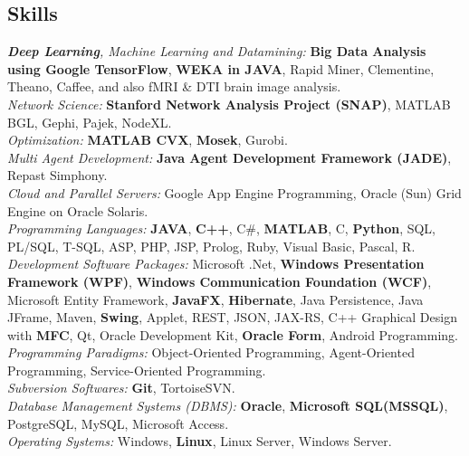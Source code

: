 \documentclass[letter]{res}
\begin{document}
\begin{resume}
		\section{Skills}
		{\sl \textbf{Deep Learning}, Machine Learning and Datamining: }\textbf{Big Data Analysis using Google TensorFlow}, \textbf{WEKA in JAVA}, Rapid Miner, Clementine, Theano, Caffee, and also fMRI \& DTI brain image analysis.\\
		{\sl Network Science: }\textbf{Stanford Network Analysis Project (SNAP)}, MATLAB BGL, Gephi, Pajek, NodeXL.\\
		{\sl Optimization: }\textbf{MATLAB CVX}, \textbf{Mosek}, Gurobi.\\
		{\sl Multi Agent Development: }\textbf{Java Agent Development Framework (JADE)}, Repast Simphony.\\
		{\sl Cloud and Parallel Servers: }Google App Engine Programming, Oracle (Sun) Grid Engine on Oracle Solaris.\\
		\textit{Programming Languages: }\textbf{JAVA}, \textbf{C++}, C\#, \textbf{MATLAB}, C, \textbf{Python}, SQL, PL/SQL, T-SQL, ASP, PHP, JSP, Prolog, Ruby, Visual Basic, Pascal, R.\\
		\textit{Development Software Packages: }Microsoft .Net, \textbf{Windows Presentation Framework (WPF)}, \textbf{Windows Communication Foundation (WCF)}, Microsoft Entity Framework, \textbf{JavaFX}, \textbf{Hibernate}, Java Persistence, Java JFrame, Maven, \textbf{Swing}, Applet, REST, JSON, JAX-RS, C++ Graphical Design with \textbf{MFC}, Qt, Oracle Development Kit, \textbf{Oracle Form}, Android Programming.\\
		\textit{Programming Paradigms: }Object-Oriented Programming, Agent-Oriented Programming, Service-Oriented Programming.\\
		\textit{Subversion Softwares: }\textbf{Git}, TortoiseSVN.\\
		\textit{Database Management Systems (DBMS): }\textbf{Oracle}, \textbf{Microsoft SQL(MSSQL)}, PostgreSQL, MySQL, Microsoft Access.\\
		\textit{Operating Systems: }Windows, \textbf{Linux}, Linux Server, Windows Server.
		

\end{resume}
\end{document}
